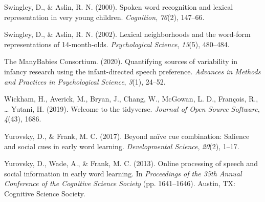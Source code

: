 \documentclass[10pt, letterpaper]{article}
\begin{document}
\leavevmode\hypertarget{ref-Swingley2000}{}%
Swingley, D., \& Aslin, R. N. (2000). Spoken word recognition and
lexical representation in very young children. \emph{Cognition},
\emph{76}(2), 147--66.

\leavevmode\hypertarget{ref-Swingley2002}{}%
Swingley, D., \& Aslin, R. N. (2002). Lexical neighborhoods and the
word-form representations of 14-month-olds. \emph{Psychological
Science}, \emph{13}(5), 480--484.

\leavevmode\hypertarget{ref-TheManyBabiesConsortium2020}{}%
The ManyBabies Consortium. (2020). Quantifying sources of variability in
infancy research using the infant-directed speech preference.
\emph{Advances in Methods and Practices in Psychological Science},
\emph{3}(1), 24--52.

\leavevmode\hypertarget{ref-Wickham2019}{}%
Wickham, H., Averick, M., Bryan, J., Chang, W., McGowan, L. D.,
François, R., \ldots{} Yutani, H. (2019). Welcome to the tidyverse.
\emph{Journal of Open Source Software}, \emph{4}(43), 1686.

\leavevmode\hypertarget{ref-Yurovsky2017}{}%
Yurovsky, D., \& Frank, M. C. (2017). Beyond naïve cue combination:
Salience and social cues in early word learning. \emph{Developmental
Science}, \emph{20}(2), 1--17.

\leavevmode\hypertarget{ref-Yurovsky2013}{}%
Yurovsky, D., Wade, A., \& Frank, M. C. (2013). Online processing of
speech and social information in early word learning. In
\emph{Proceedings of the 35th Annual Conference of the Cognitive Science
Society} (pp. 1641--1646). Austin, TX: Cognitive Science Society.


\end{document}
